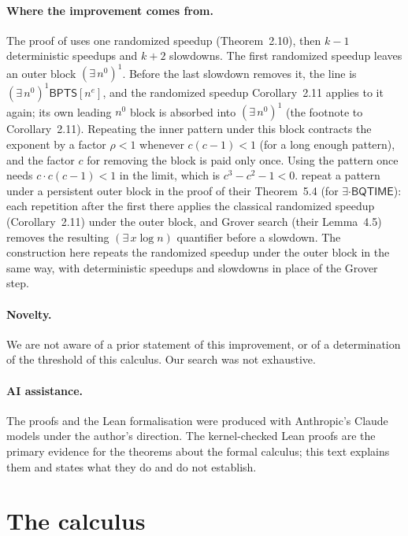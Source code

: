 \documentclass[11pt]{article}
\theoremstyle{definition}
\newcommand{\BPTS}{\mathsf{BPTS}}
\begin{document}
\paragraph{Where the improvement comes from.}
The proof of \cite[Theorem~5.3]{MW21} uses one randomized speedup (Theorem~2.10), then $k-1$ deterministic speedups and $k+2$ slowdowns. The first randomized speedup leaves an outer block $(\exists\,n^0)^1$. Before the last slowdown removes it, the line is $(\exists\,n^0)^1\BPTS[n^{e}]$, and the randomized speedup Corollary~2.11 applies to it again; its own leading $n^0$ block is absorbed into $(\exists\,n^0)^1$ (the footnote to Corollary~2.11). Repeating the inner pattern under this block contracts the exponent by a factor $\rho<1$ whenever $c(c-1)<1$ (for a long enough pattern), and the factor $c$ for removing the block is paid only once. Using the pattern once needs $c\cdot c(c-1)<1$ in the limit, which is $c^3-c^2-1<0$. \cite{MW21} repeat a pattern under a persistent outer block in the proof of their Theorem~5.4 (for $\exists\cdot\mathsf{BQTIME}$): each repetition after the first there applies the classical randomized speedup (Corollary~2.11) under the outer block, and Grover search (their Lemma~4.5) removes the resulting $(\exists\,x\log n)$ quantifier before a slowdown. The construction here repeats the randomized speedup under the outer block in the same way, with deterministic speedups and slowdowns in place of the Grover step.

\paragraph{Novelty.}
We are not aware of a prior statement of this improvement, or of a determination of the threshold of this calculus. Our search was not exhaustive.

\paragraph{AI assistance.}
The proofs and the Lean formalisation were produced with Anthropic's Claude models under the author's direction. The kernel-checked Lean proofs are the primary evidence for the theorems about the formal calculus; this text explains them and states what they do and do not establish.

\section{The calculus}\label{sec:calculus}
\end{document}
